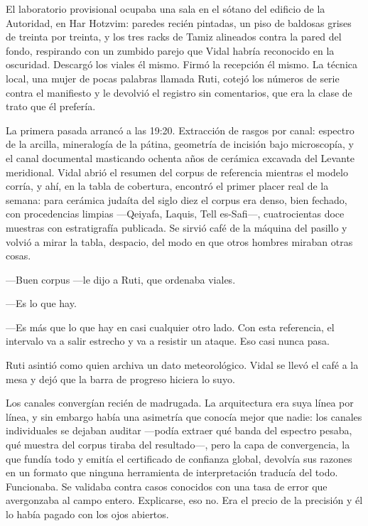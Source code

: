 \scenebreak


El laboratorio provisional ocupaba una sala en el sótano del edificio de la Autoridad, en Har Hotzvim: paredes recién pintadas, un piso de baldosas grises de treinta por treinta, y los tres racks de Tamiz alineados contra la pared del fondo, respirando con un zumbido parejo que Vidal habría reconocido en la oscuridad. Descargó los viales él mismo. Firmó la recepción él mismo. La técnica local, una mujer de pocas palabras llamada Ruti, cotejó los números de serie contra el manifiesto y le devolvió el registro sin comentarios, que era la clase de trato que él prefería.

La primera pasada arrancó a las 19:20. Extracción de rasgos por canal: espectro de la arcilla, mineralogía de la pátina, geometría de incisión bajo microscopía, y el canal documental masticando ochenta años de cerámica excavada del Levante meridional. Vidal abrió el resumen del corpus de referencia mientras el modelo corría, y ahí, en la tabla de cobertura, encontró el primer placer real de la semana: para cerámica judaíta del siglo diez el corpus era denso, bien fechado, con procedencias limpias ---Qeiyafa, Laquis, Tell es-Safi---, cuatrocientas doce muestras con estratigrafía publicada. Se sirvió café de la máquina del pasillo y volvió a mirar la tabla, despacio, del modo en que otros hombres miraban otras cosas.

---Buen corpus ---le dijo a Ruti, que ordenaba viales.

---Es lo que hay.

---Es más que lo que hay en casi cualquier otro lado. Con esta referencia, el intervalo va a salir estrecho y va a resistir un ataque. Eso casi nunca pasa.

Ruti asintió como quien archiva un dato meteorológico. Vidal se llevó el café a la mesa y dejó que la barra de progreso hiciera lo suyo.

Los canales convergían recién de madrugada. La arquitectura era suya línea por línea, y sin embargo había una asimetría que conocía mejor que nadie: los canales individuales se dejaban auditar ---podía extraer qué banda del espectro pesaba, qué muestra del corpus tiraba del resultado---, pero la capa de convergencia, la que fundía todo y emitía el certificado de confianza global, devolvía sus razones en un formato que ninguna herramienta de interpretación traducía del todo. Funcionaba. Se validaba contra casos conocidos con una tasa de error que avergonzaba al campo entero. Explicarse, eso no. Era el precio de la precisión y él lo había pagado con los ojos abiertos.

